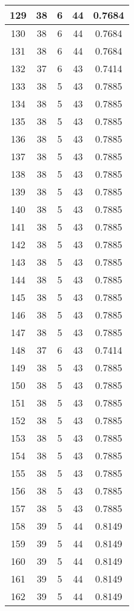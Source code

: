\documentclass[letterpaper, 12pt]{article}
\begin{document}
\begin{longtable}{|c|c|c|c|c|}
\hline
129 & 38 & 6 & 44 & 0.7684 \\
\hline
130 & 38 & 6 & 44 & 0.7684 \\
\hline
131 & 38 & 6 & 44 & 0.7684 \\
\hline
132 & 37 & 6 & 43 & 0.7414 \\
\hline
133 & 38 & 5 & 43 & 0.7885 \\
\hline
134 & 38 & 5 & 43 & 0.7885 \\
\hline
135 & 38 & 5 & 43 & 0.7885 \\
\hline
136 & 38 & 5 & 43 & 0.7885 \\
\hline
137 & 38 & 5 & 43 & 0.7885 \\
\hline
138 & 38 & 5 & 43 & 0.7885 \\
\hline
139 & 38 & 5 & 43 & 0.7885 \\
\hline
140 & 38 & 5 & 43 & 0.7885 \\
\hline
141 & 38 & 5 & 43 & 0.7885 \\
\hline
142 & 38 & 5 & 43 & 0.7885 \\
\hline
143 & 38 & 5 & 43 & 0.7885 \\
\hline
144 & 38 & 5 & 43 & 0.7885 \\
\hline
145 & 38 & 5 & 43 & 0.7885 \\
\hline
146 & 38 & 5 & 43 & 0.7885 \\
\hline
147 & 38 & 5 & 43 & 0.7885 \\
\hline
148 & 37 & 6 & 43 & 0.7414 \\
\hline
149 & 38 & 5 & 43 & 0.7885 \\
\hline
150 & 38 & 5 & 43 & 0.7885 \\
\hline
151 & 38 & 5 & 43 & 0.7885 \\
\hline
152 & 38 & 5 & 43 & 0.7885 \\
\hline
153 & 38 & 5 & 43 & 0.7885 \\
\hline
154 & 38 & 5 & 43 & 0.7885 \\
\hline
155 & 38 & 5 & 43 & 0.7885 \\
\hline
156 & 38 & 5 & 43 & 0.7885 \\
\hline
157 & 38 & 5 & 43 & 0.7885 \\
\hline
158 & 39 & 5 & 44 & 0.8149 \\
\hline
159 & 39 & 5 & 44 & 0.8149 \\
\hline
160 & 39 & 5 & 44 & 0.8149 \\
\hline
161 & 39 & 5 & 44 & 0.8149 \\
\hline
162 & 39 & 5 & 44 & 0.8149 \\

\end{longtable}
\end{document}
